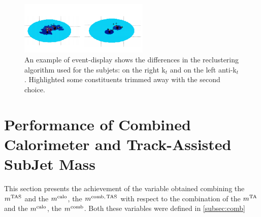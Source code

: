 \begin{figure}[!ht]
  \centering
      \includegraphics[width=0.55\textwidth]{jet_part/mtas/evtdspl.png}
  \caption[Different reclustering in event display]{An example of event-display shows the differences in the reclustering algorithm used for the subjets: on the right  k$_t$ and on the left anti-k$_t$. Highlighted some constituents trimmed away with the second choice.}
  \label{fig:evtdspl}
\end{figure}



   

   

   

\clearpage
\newpage
\section{Performance of Combined Calorimeter and Track-Assisted SubJet Mass}
This section presents the achievement of the variable obtained combining the $m^\textrm{TAS}$ and the $m^\textrm{calo}$, the $m^\textrm{comb,\,TAS}$ with respect to the combination of the $m^\textrm{TA}$ and the $m^\textrm{calo}$, the $m^\textrm{comb}$. Both these variables were defined in \ref{subsec:comb}

